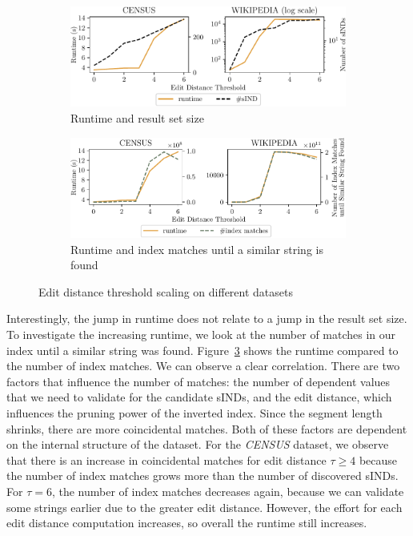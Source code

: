 \begin{figure}
    \centering
    \begin{subfigure}[b]{.8\textwidth}
        \centering
        \includegraphics[width=\textwidth]{figures/ed_scaling.pdf}
        \caption{Runtime and result set size}
        \label{fig:eval:ed}
    \end{subfigure}
    \begin{subfigure}[b]{.8\textwidth}
        \centering
        \includegraphics[width=\textwidth]{figures/ed_scaling_explanation.pdf}
        \caption{Runtime and index matches until a similar string is found}
        \label{fig:eval:ed_explanation}
    \end{subfigure}
    \caption{Edit distance threshold scaling on different datasets}
\end{figure}

Interestingly, the jump in runtime does not relate to a jump in the result set size.
To investigate the increasing runtime, we look at the number of matches in our index until a similar string was found.
Figure~\ref{fig:eval:ed_explanation} shows the runtime compared to the number of index matches.
We can observe a clear correlation.
There are two factors that influence the number of matches:
the number of dependent values that we need to validate for the candidate sINDs, and the edit distance, which influences the pruning power of the inverted index.
Since the segment length shrinks, there are more coincidental matches.
Both of these factors are dependent on the internal structure of the dataset.
For the \emph{CENSUS} dataset, we observe that there is an increase in coincidental matches for edit distance $\tau \geq 4$ because the number of index matches grows more than the number of discovered sINDs.
For $\tau = 6$, the number of index matches decreases again, because we can validate some strings earlier due to the greater edit distance.
However, the effort for each edit distance computation increases, so overall the runtime still increases.

